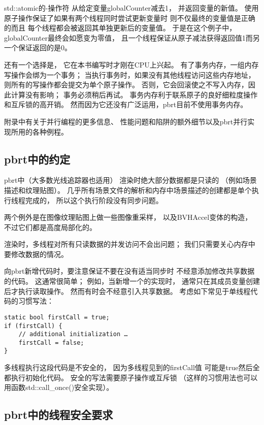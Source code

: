 {\ttfamily std::atomic}的{\ttfamily -}操作符
从给定变量{\ttfamily globalCounter}减去1，
并返回变量的新值。
使用原子操作保证了如果有两个线程同时尝试更新变量时
则不仅最终的变量值是正确的而且
每个线程都会被返回其单独更新后的变量值。
于是在这个例子中，{\ttfamily globalCounter}最终会如愿变为零值，
且一个线程保证从原子减法获得返回值1而另一个保证返回的是0。

还有一个选择是，
它在本书编写时才刚在CPU上兴起。
有了事务内存，一组内存写操作会绑为一个事务；
当执行事务时，如果没有其他线程访问这些内存地址，
则所有的写操作都会提交为单个原子操作。
否则，它会回滚使之不写入内存，因此计算没有影响；
事务必须稍后再试。
事务内存利于联系原子的良好细粒度操作和互斥锁的高开销。
然而因为它还没有广泛运用，pbrt目前不使用事务内存。

附录中有关于并行编程的更多信息、
性能问题和陷阱的额外细节以及pbrt并行实现所用的各种例程。

\subsection{pbrt中的约定}\label{sub:pbrt中的约定}
pbrt中（大多数光线追踪器也适用）
渲染时绝大部分数据都是只读的
（例如场景描述和纹理贴图）。
几乎所有场景文件的解析和内存中场景描述的创建都是单个执行线程完成的，
所以这个执行阶段没有同步问题。
\begin{remark}
    两个例外是在图像纹理贴图上做一些图像重采样，
    以及{\ttfamily BVHAccel}变体的构造，
    不过它们都是高度局部化的。
\end{remark}
渲染时，多线程对所有只读数据的并发访问不会出问题；
我们只需要关心内存中要修改数据的情况。

向pbrt新增代码时，要注意保证不要在没有适当同步时
不经意添加修改共享数据的代码。
这通常很简单；
例如，当新增一个的实现时，
通常只在其成员变量创建后才执行读取操作。
然而有时会不经意引入共享数据。
考虑如下常见于单线程代码的习惯写法：
\begin{lstlisting}
static bool firstCall = true;
if (firstCall) {
    // additional initialization …
    firstCall = false;
}
\end{lstlisting}

多线程执行这段代码是不安全的，
因为多线程见到的{\ttfamily firstCall}值
可能是{\ttfamily true}然后全都执行初始化代码。
安全的写法需要原子操作或互斥锁
（这样的习惯用法也可以用函数{\ttfamily std::call\_once()}安全实现）。

\subsection{pbrt中的线程安全要求}

